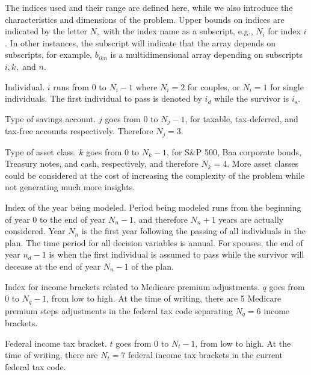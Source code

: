 \documentclass{report}[fleqn,12pt]
\begin{document}
The indices used and their range are defined here, while we also
introduce the characteristics and dimensions of the problem.
Upper bounds on indices are indicated by the letter $N,$ with the
index name as a subscript, e.g., $N_i$ for index $i$. In other instances,
the subscript will indicate that the array depends on subscripts, for example,
$b_{ikn}$ is a multidimensional array depending on subscripts $i, k,$ and $n$.
\begin{description}[leftmargin=4em,style=multiline]
\item [$i$]
	Individual. $i$ runs from 0 to $N_i - 1$ where $N_i = 2$ for couples,
	or $N_i= 1$ for single individuals. The first individual to pass
	is denoted by $i_d$ while the survivor is $i_s$.
\item [$j$]
	Type of savings account. $j$ goes from 0 to $N_j - 1$, for taxable, tax-deferred,
	and tax-free accounts respectively. Therefore $N_j = 3$.
\item[$k$]
	Type of asset class. $k$ goes from 0 to $N_k -1 $, for S\&P 500,
	Baa corporate bonds, Treasury notes, and cash, respectively,
        and therefore $N_k = 4$.
	More asset classes could be considered at the cost of increasing
	the complexity of the problem while not generating much more insights.
\item [$n$]
	Index of the year being modeled. Period being modeled runs from the beginning of year 0 to 
	the end of year $N_n-1$, and therefore $N_n + 1$ years are actually considered.
	Year $N_n$ is the first year following the passing of all
	individuals in the plan. The time period for all decision variables is annual.
	For spouses, the end of year $n_d-1$ is when the first individual is assumed to pass while
	the survivor will decease at the end of year $N_n-1$ of the plan.
\item [$q$]
	Index for income brackets related to Medicare premium adjustments.
	$q$ goes from 0 to $N_q - 1$, from low to high.
	At the time of writing, there are 5 Medicare premium steps adjustments
        in the federal tax code separating $N_q = 6$ income brackets.
\item [$t$]
	Federal income tax bracket. $t$ goes from 0 to $N_t - 1$, from low to high.
	At the time of writing, there are $N_t = 7$ federal income tax brackets in the current federal tax code.
\end{description}
\end{document}
